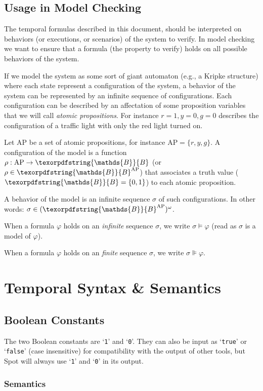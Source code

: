 \documentclass[a4paper,twoside,10pt,DIV=12]{scrreprt}
\newcommand{\B}{\texorpdfstring{\ensuremath{\mathds{B}}}{B}}
\newcommand{\AP}{\ensuremath{\mathrm{AP}}}
\newcommand{\0}{\texttt{0}}
\newcommand{\1}{\texttt{1}}
\newcommand\samp[1]{`\texttt{#1}'}
\begin{document}
\section{Usage in Model Checking}

The temporal formulas described in this document, should be
interpreted on behaviors (or executions, or scenarios) of the system
to verify.  In model checking we want to ensure that a formula (the
property to verify) holds on all possible behaviors of the system.

If we model the system as some sort of giant automaton (e.g., a Kripke
structure) where each state represent a configuration of the system, a
behavior of the system can be represented by an infinite sequence of
configurations.  Each configuration can be described by an affectation
of some proposition variables that we will call \emph{atomic
  propositions}.  For instance $r=1,y=0,g=0$ describes the
configuration of a traffic light with only the red light turned on.

Let $\AP$ be a set of atomic propositions, for instance
$\AP=\{r,y,g\}$.  A configuration of the model is a function
$\rho:\AP\to\B$ (or $\rho\in\B^\AP$) that associates a truth value
($\B=\{0,1\}$) to each atomic proposition.

A behavior of the model is an infinite sequence $\sigma$ of such
configurations.  In other words: $\sigma\in(\B^\AP)^\omega$.

When a formula $\varphi$ holds on an \emph{infinite} sequence
$\sigma$, we write $\sigma \vDash \varphi$ (read as $\sigma$ is a
model of $\varphi$).

When a formula $\varphi$ holds on an \emph{finite} sequence $\sigma$,
we write $\sigma \VDash \varphi$.

\chapter{Temporal Syntax \& Semantics}

\section{Boolean Constants}\label{sec:bool}

The two Boolean constants are \samp{1} and \samp{0}.  They can also be
input as \samp{true} or \samp{false} (case insensitive) for
compatibility with the output of other tools, but Spot will always use
\samp{1} and \samp{0} in its output.

\subsection{Semantics}
\end{document}

